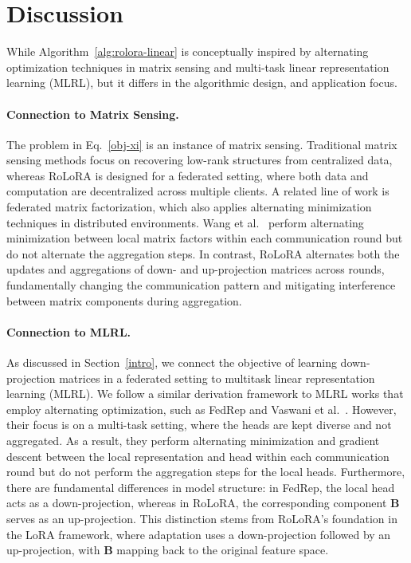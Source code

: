 \documentclass{article}
\theoremstyle{plain}
\theoremstyle{definition}
\theoremstyle{remark}
\begin{document}
\section{Discussion} \label{app:discussion}
{
While Algorithm~\ref{alg:rolora-linear} is conceptually inspired by alternating optimization techniques in matrix sensing and multi-task linear representation learning (MLRL), but it differs in the algorithmic design, and application focus.

\paragraph{Connection to Matrix Sensing.} The problem in Eq.~\eqref{obj-xi} is an instance of matrix sensing. Traditional matrix sensing methods \cite{10.1145/2488608.2488693} focus on recovering low-rank structures from centralized data, whereas RoLoRA is designed for a federated setting, where both data and computation are decentralized across multiple clients. A related line of work is federated matrix factorization, which also applies alternating minimization techniques in distributed environments.  Wang et al.~\cite{wang2020federatedmatrixfactorizationalgorithm} perform alternating minimization between local matrix factors within each communication round but do not alternate the aggregation steps. In contrast, RoLoRA alternates both the updates and aggregations of down- and up-projection matrices across rounds, fundamentally changing the communication pattern and mitigating interference between matrix components during aggregation.

\paragraph{Connection to MLRL.} As discussed in Section~\ref{intro}, we connect the objective of learning down-projection matrices in a federated setting to multitask
linear representation learning (MLRL)\cite{pmlr-v139-collins21a,thekumparampil2021sampleefficientlinearmetalearning,Vaswani_2024,du2021fewshot}. We follow a similar derivation framework to MLRL works that employ alternating optimization, such as FedRep\cite{pmlr-v139-collins21a} and Vaswani et al.~\cite{Vaswani_2024}. However, their focus is on a multi-task setting, where the heads are kept diverse and not aggregated. As a result, they perform alternating minimization and gradient descent between the local representation and head within each communication round but do not perform the aggregation steps for the local heads. Furthermore, there are fundamental differences in model structure: in FedRep, the local head acts as a down-projection, whereas in RoLoRA, the corresponding component $\mathbf{B}$ serves as an up-projection. This distinction stems from RoLoRA’s foundation in the LoRA framework, where adaptation uses a down-projection followed by an up-projection, with $\mathbf{B}$ mapping back to the original feature space.

}
\end{document}

